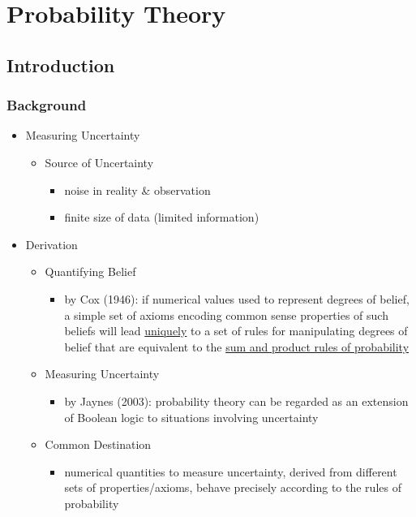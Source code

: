  
\section{Probability Theory}

\subsection{Introduction}

\subsubsection{Background}
\begin{itemize}
\item Measuring Uncertainty
	\begin{itemize}
	\item Source of Uncertainty
		\begin{itemize}
		\item noise in reality \& observation
		\item finite size of data (limited information)
		\end{itemize}
	\end{itemize}
\item Derivation
	\begin{itemize}
	\item Quantifying Belief
		\begin{itemize}
		\item by Cox (1946): if numerical values used to
		represent degrees of belief, a simple set of axioms encoding common sense
		properties of such beliefs will lead \underline{uniquely} to a set of rules for manipulating degrees of
		belief that are equivalent to the \underline{sum and product rules of probability}
		\end{itemize}
	\item Measuring Uncertainty
		\begin{itemize}
		\item by Jaynes (2003): probability theory can be regarded as an extension of
		Boolean logic to situations involving uncertainty
		\end{itemize}
	\item Common Destination
		\begin{itemize}
		\item numerical quantities to measure uncertainty, derived from different sets of properties/axioms, behave precisely according to the rules of probability
		\end{itemize}
	\end{itemize}
\end{itemize}

